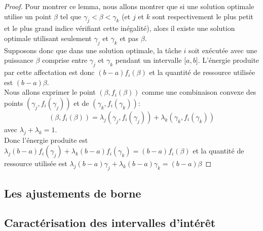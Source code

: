 \begin{proof}
  Pour montrer ce lemma, nous allons montrer que si une solution optimale utilise un point $\beta$ tel que $ \gamma_j < \beta < \gamma_k$ (et $j$ et $k$ sont respectivement le plus petit et le plus grand indice vérifiant cette inégalité), alors il existe une solution optimale utilisant seulement $\gamma_j$ et $\gamma_k$ et pas $\beta$.\\
Supposons donc que dans une solution optimale, la tâche $i$ soit exécutée avec une puissance $\beta$ comprise entre $\gamma_j$ et $\gamma_k$ pendant un intervalle ${[}a,b{]}$. L'énergie produite par cette affectation est donc $(b-a)f_i(\beta)$ et la quantité de ressource utilisée est $(b-a)\beta$.\\
Nous allons exprimer le point $(\beta,f_i(\beta))$ comme une combinaison convexe des points $(\gamma_j,f_i(\gamma_j))$ et de $(\gamma_k,f_i(\gamma_k))$:
\[ (\beta,f_i(\beta))= \lambda_j (\gamma_j,f_i(\gamma_j)) + \lambda_k (\gamma_k,f_i(\gamma_k))
\]
avec $\lambda_j + \lambda_k=1$.\\
Donc l'énergie produite est $\lambda_j(b-a)f_i(\gamma_j)+\lambda_k(b-a)f_i(\gamma_k)=(b-a)f_i(\beta)$ et la quantité de ressource utilisée est $\lambda_j(b-a)\gamma_j+\lambda_k(b-a)\gamma_k=(b-a)\beta$

\end{proof}


\subsection{Les ajustements de borne}
\label{sec:adjustment_tw}
\subsection{Caractérisation des intervalles d'intérêt}